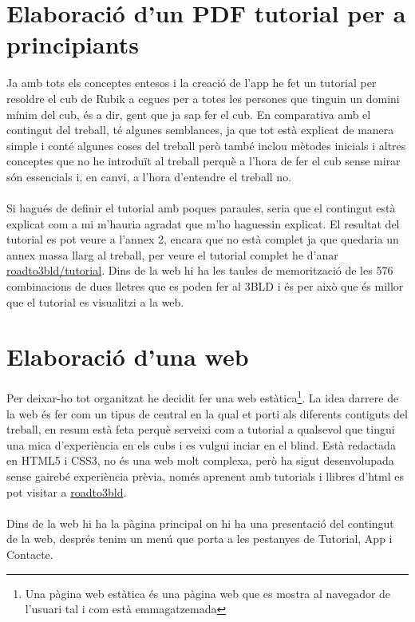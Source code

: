 \chapter{Elaboració d'un PDF tutorial per a principiants}

Ja amb tots els conceptes entesos i la creació de l'app he fet un tutorial per resoldre el cub de Rubik a cegues per a totes les persones que tinguin un domini mínim del cub, és a dir, gent que ja sap fer el cub. 
En comparativa amb el contingut del treball, té algunes semblances, ja que tot està explicat de manera simple i conté algunes coses del treball però també inclou mètodes inicials i altres conceptes que no he introduït al treball perquè a l'hora de fer el cub sense mirar són essencials i, en canvi, a l'hora d'entendre el treball no.\cite{Cuber} \cite{EdgeSetup} \cite{Progressio}
\\\\Si hagués de definir el tutorial amb poques paraules, seria que el contingut està explicat com a mi m'hauria agradat que m'ho haguessin explicat. El resultat del tutorial es pot veure a l'annex 2, encara que no està complet ja que quedaria un annex massa llarg al treball, per veure el tutorial complet he d'anar \href{https://polsances13.github.io/roadto3bld/Tutorial.html}{roadto3bld/tutorial}. Dins de la web hi ha les taules de memorització de les 576 combinacions de dues lletres que es poden fer al 3BLD i és per això que és millor que el tutorial es visualitzi a la web.




\chapter{Elaboració d'una web}

Per deixar-ho tot organitzat he decidit fer una web estàtica\footnote{Una pàgina web estàtica és una pàgina web que es mostra al navegador de l'usuari tal i com està emmagatzemada}. La idea darrere de la web és fer com un tipus de central en la qual et porti als diferents contiguts del treball, en resum està feta perquè serveixi com a tutorial a qualsevol que tingui una mica d'experiència en els cubs i es vulgui inciar en el blind.
Està redactada en HTML5 i CSS3, no és una web molt complexa, però ha sigut desenvolupada sense gairebé experiència prèvia, només aprenent amb tutorials i llibres d'html es pot visitar a \href{https://polsances13.github.io/roadto3bld/index.html}{roadto3bld}.
\\\\Dins de la web hi ha la pàgina principal on hi ha una presentació del contingut de la web, després tenim un menú que porta a les pestanyes de Tutorial, App i Contacte. \cite{AjudaWeb}

